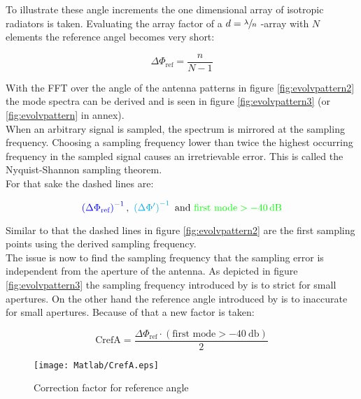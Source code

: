To illustrate these angle increments the one dimensional array of isotropic radiators is taken. Evaluating the array factor of a $d = \sfrac{\lambda}{n}$ -array with $N$ elements the reference angel becomes very short:

\begin{equation}
\Delta\Phi_{\text{ref}} = \frac{n}{N-1}
\label{eq:1dinc}
\end{equation}

With the \ac{FFT} over the angle of the antenna patterns in figure \ref{fig:evolvpattern2} the mode spectra can be derived and is seen in figure \ref{fig:evolvpattern3} (or \ref{fig:evolvpattern} in annex).\\
When an arbitrary signal is sampled, the spectrum is mirrored at the sampling frequency. Choosing a sampling frequency lower than twice the highest occurring frequency in the sampled signal causes an irretrievable error. This is called the Nyquist-Shannon sampling theorem.\\
For that sake the dashed lines are:

\begin{equation}
\color{blue}\left(\Delta\Phi_{\text{ref}}\right)^{-1}\color{black},\ \color{cyan}\left(\Delta\Phi'\right)^{-1}\color{black}\ \text{and}\ \color{green}\text{first mode} > \SI{-40}{\decibel} \color{black}
\end{equation}

Similar to that the dashed lines in figure \ref{fig:evolvpattern2} are the first sampling points using the derived sampling frequency.\\
The issue is now to find the sampling frequency that the sampling error is independent from the aperture of the antenna. As depicted in figure \ref{fig:evolvpattern3} the sampling frequency introduced by \cite{hansen} is to strict for small apertures. On the other hand the reference angle introduced by \cite{2018arXiv180310993F} is to inaccurate for small apertures. Because of that a new factor is taken:

\begin{equation}
\text{CrefA} = \frac{\Delta\Phi_{\text{ref}}\cdot\left(\text{first mode} > \SI{-40}{\decibel}\right)}{2}
\end{equation} 

\begin{figure}
\centering
\texttt{[image: Matlab/CrefA.eps]}
\caption{Correction factor for reference angle}
\label{fig:crefa}
\end{figure}

